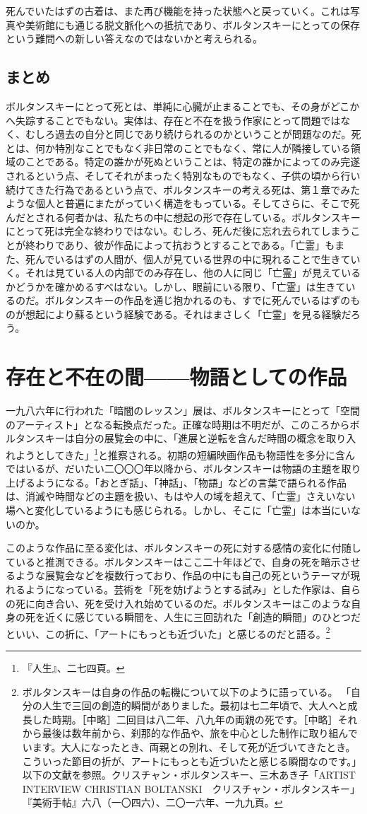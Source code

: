 \documentclass[b5j,twoside,twocolumn]{utarticle}
\newcommand{\mysection}[1]{\vspace{-5mm}\section{#1}\vspace{-2mm}}
\newcommand{\mysubsection}[1]{\vspace{-6mm}\subsection{#1}\vspace{-2mm}}
\begin{document}
死んでいたはずの古着は、また再び機能を持った状態へと戻っていく。これは写真や美術館にも通じる脱文脈化への抵抗であり、ボルタンスキーにとっての保存という難問への新しい答えなのではないかと考えられる。
\mysubsection{まとめ}
ボルタンスキーにとって死とは、単純に心臓が止まることでも、その身がどこかへ失踪することでもない。実体は、存在と不在を扱う作家にとって問題ではなく、むしろ過去の自分と同じであり続けられるのかということが問題なのだ。死とは、何か特別なことでもなく非日常のことでもなく、常に人が隣接している領域のことである。特定の誰かが死ぬということは、特定の誰かによってのみ完遂されるという点、そしてそれがまったく特別なものでもなく、子供の頃から行い続けてきた行為であるという点で、ボルタンスキーの考える死は、第１章でみたような個人と普遍にまたがっていく構造をもっている。そしてさらに、そこで死んだとされる何者かは、私たちの中に想起の形で存在している。ボルタンスキーにとって死は完全な終わりではない。むしろ、死んだ後に忘れ去られてしまうことが終わりであり、彼が作品によって抗おうとすることである。「亡霊」もまた、死んでいるはずの人間が、個人が見ている世界の中に現れることで生きていく。それは見ている人の内部でのみ存在し、他の人に同じ「亡霊」が見えているかどうかを確かめるすべはない。しかし、眼前にいる限り、「亡霊」は生きているのだ。ボルタンスキーの作品を通じ抱かれるのも、すでに死んでいるはずのものが想起により蘇るという経験である。それはまさしく「亡霊」を見る経験だろう。

\mysection{\tbaselineshift =3.0pt 存在と不在の間------物語としての作品}
一九八六年に行われた「暗闇のレッスン」展は、ボルタンスキーにとって「空間のアーティスト」となる転換点だった。正確な時期は不明だが、このころからボルタンスキーは自分の展覧会の中に、「進展と逆転を含んだ時間の概念を取り入れようとしてきた」\footnote{『人生』、二七四頁。}と推察される。初期の短編映画作品も物語性を多分に含んではいるが、だいたい二〇〇〇年以降から、ボルタンスキーは物語の主題を取り上げるようになる。「おとぎ話」、「神話」、「物語」などの言葉で語られる作品は、消滅や時間などの主題を扱い、もはや人の域を超えて、「亡霊」さえいない場へと変化しているようにも感じられる。しかし、そこに「亡霊」は本当にいないのか。


このような作品に至る変化は、ボルタンスキーの死に対する感情の変化に付随していると推測できる。ボルタンスキーはここ二十年ほどで、自身の死を暗示させるような展覧会などを複数行っており、作品の中にも自己の死というテーマが現れるようになっている。芸術を「死を妨げようとする試み」とした作家は、自らの死に向き合い、死を受け入れ始めているのだ。ボルタンスキーはこのような自身の死を近くに感じている瞬間を、人生に三回訪れた「創造的瞬間」のひとつだといい、この折に、「アートにもっとも近づいた」と感じるのだと語る。\footnote{ボルタンスキーは自身の作品の転機について以下のように語っている。
「自分の人生で三回の創造的瞬間がありました。最初は七二年頃で、大人へと成長した時期。［中略］二回目は八二年、八九年の両親の死です。［中略］それから最後は数年前から、刹那的な作品や、旅を中心とした制作に取り組んでいます。大人になったとき、両親との別れ、そして死が近づいてきたとき。こういった節目の折が、アートにもっとも近づいたと感じる瞬間なのです。」以下の文献を参照。クリスチャン・ボルタンスキー、三木あき子「ARTIST INTERVIEW CHRISTIAN BOLTANSKI　クリスチャン・ボルタンスキー」『美術手帖』六八（一〇四六）、二〇一六年、一九九頁。}
\end{document}
